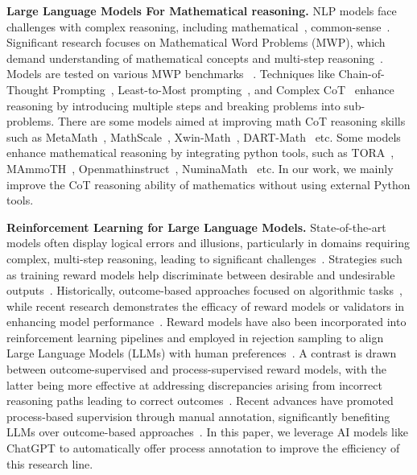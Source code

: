 \textbf{Large Language Models For Mathematical reasoning.} NLP models face challenges with complex reasoning, including mathematical~\citep{long2024-llms-survey, zhang2024-geoeval, xia2024-evaluating}, common-sense~\citep{talmor-etal-2019-commonsenseqa}. Significant research focuses on Mathematical Word Problems (MWP), which demand understanding of mathematical concepts and multi-step reasoning~\citep{zheng2023php,zhao2023modelselection, yuan2023RFT}. Models are tested on various MWP benchmarks ~\citep{roy-roth-2015-solving-multiarith, hendrycks2021measuring}. Techniques like Chain-of-Thought Prompting~\citep{wei2022chain}, Least-to-Most prompting~\citep{Zhou2022LeasttoMostPE}, and Complex CoT~\citep{fu2023complexity-cot-based} enhance reasoning by introducing multiple steps and breaking problems into sub-problems. There are some models aimed at improving math CoT reasoning skills such as MetaMath~\citep{yu2023metamath}, 
 MathScale~\citep{tang2024mathscale}, Xwin-Math~\citep{li2024-Xwin-math}, DART-Math~\citep{tong2024-DART} etc. Some models enhance mathematical reasoning by integrating python tools, such as TORA~\citep{gou2023tora}, 
  MAmmoTH~\citep{yue2023mammoth}, 
  Openmathinstruct~\citep{toshniwal2024-openmathinstruct}, NuminaMath~\citep{li2024-numinamath} etc. In our work, we mainly improve the CoT reasoning ability of mathematics without using external Python tools.

\textbf{Reinforcement Learning for Large Language Models.} State-of-the-art models often display logical errors and illusions, particularly in domains requiring complex, multi-step reasoning, leading to significant challenges~\citep{bubeck2023sparks, maynez2020faithfulness}. Strategies such as training reward models help discriminate between desirable and undesirable outputs~\citep{lightman2023openai-verify-step-by-step,Wu2023FineGrainedHF, chen2024-fine-grain-improving}. Historically, outcome-based approaches focused on algorithmic tasks~\citep{ Li2016NeuralPL, cai2017making,Yu2023OutcomesupervisedVF}, while recent research demonstrates the efficacy of reward models or validators in enhancing model performance~\citep{cobbe2021training_gsm8k_2,Wang2023MakingLL,Wang2023LargeLM,Li2022MakingLM}. Reward models have also been incorporated into reinforcement learning pipelines and employed in rejection sampling to align Large Language Models (LLMs) with human preferences~\citep{ shen2021generate,bai2022constitutional-claude,yuan2023rrhf, dong2023raft,song2023preference, touvron2023llama2, rafailov2024DPO, meng2024simpo}. A contrast is drawn between outcome-supervised and process-supervised reward models, with the latter being more effective at addressing discrepancies arising from incorrect reasoning paths leading to correct outcomes~\citep{uesato2022deepmind-orms,zelikman2022star, creswell2022selectioninference}. Recent advances have promoted process-based supervision through manual annotation, significantly benefiting LLMs over outcome-based approaches~\citep{lightman2023openai-verify-step-by-step,wang2024-mathshepherd, sun2024-easy-to-hard, chen2024-autoprm, wang2024-multi-prm, zhang2024-rest-mcts}. In this paper, we leverage AI models like ChatGPT to automatically offer process annotation to improve the efficiency of this research line.

